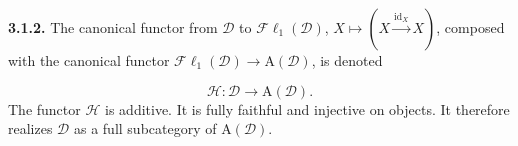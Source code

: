 \medskip
\noindent\textbf{3.1.2.}\quad
The canonical functor from $\mathcal D$ to $\mathcal{F}\ell_1(\mathcal D)$,
$X\longmapsto(X\xrightarrow{\operatorname{id}_X}X)$, composed with the
canonical functor $\mathcal{F}\ell_1(\mathcal D)\longrightarrow\mathrm A(\mathcal D)$,
is denoted

\[
\mathcal H\colon\mathcal D\longrightarrow\mathrm A(\mathcal D).
\tag{3.1.2.1}
\]
The functor $\mathcal H$ is additive. It is fully faithful and injective on
objects. It therefore realizes $\mathcal D$ as a full subcategory of
$\mathrm A(\mathcal D)$.
\endgroup
